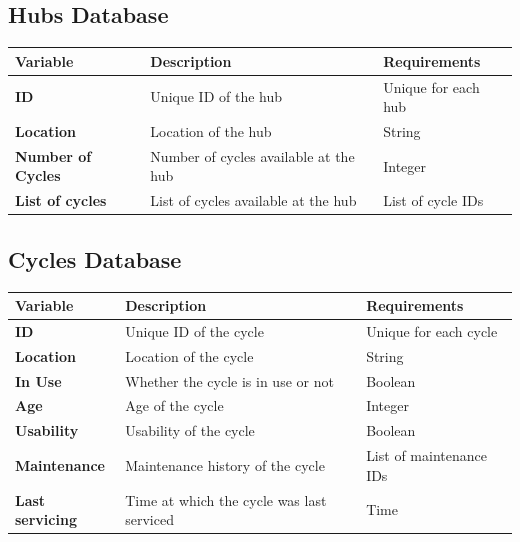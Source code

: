 \documentclass[11pt]{article}
\begin{document}
\begin{appendices}
\subsection{Hubs Database}
\begin{center}
\begin{tabular}{|>{\centering\arraybackslash}m{}|>{\centering\arraybackslash}m{}|>{\centering\arraybackslash}m{}|}
    \hline
    \textbf{Variable} & \textbf{Description} & \textbf{Requirements} \\
    \hline
    \textbf{ID} & Unique ID of the hub &  Unique for each hub\\
    \hline
    \textbf{Location} & Location of the hub &  String\\
    \hline
    \textbf{Number of Cycles} & Number of cycles available at the hub &  Integer\\
    \hline
    \textbf{List of cycles} & List of cycles available at the hub &  List of cycle IDs\\
    \hline
\end{tabular}
\end{center}

\subsection{Cycles Database}
\begin{center}
\begin{tabular}{|>{\centering\arraybackslash}m{}|>{\centering\arraybackslash}m{}|>{\centering\arraybackslash}m{}|}
    \hline
    \textbf{Variable} & \textbf{Description} & \textbf{Requirements} \\
    \hline
    \textbf{ID} & Unique ID of the cycle &  Unique for each cycle\\
    \hline
    \textbf{Location} & Location of the cycle &  String\\
    \hline
    \textbf{In Use} & Whether the cycle is in use or not &  Boolean\\
    \hline
    \textbf{Age} & Age of the cycle &  Integer\\
    \hline
    \textbf{Usability} & Usability of the cycle &  Boolean\\
    \hline
    \textbf{Maintenance} & Maintenance history of the cycle &  List of maintenance IDs\\
    \hline
    \textbf{Last servicing} & Time at which the cycle was last serviced &  Time\\
    \hline
\end{tabular}
\end{center}


\end{appendices}
\end{document}
